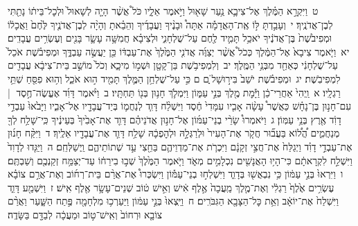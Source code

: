 \documentclass[18pt]{article}
\newcommand{\vart}[1]{\Bfootnote{#1}}	%
\begin{document}
 {\loc ט~}וַיִּקְרָ֣א הַמֶּ֗לֶךְ אֶל־צִיבָ֛א נַ֥עַר שָׁא֖וּל וַיֹּ֣אמֶר אֵלָ֑יו כֹּל֩ אֲשֶׁ֨ר הָיָ֤ה לְשָׁאוּל֙ וּלְכׇל־בֵּית֔וֹ נָתַ֖תִּי לְבֶן־אֲדֹנֶֽיךָ׃ \startlock
 {\loc י~}וְעָבַ֣דְתָּ לּ֣וֹ אֶֽת־הָאֲדָמָ֡ה אַתָּה֩ וּבָנֶ֨יךָ וַעֲבָדֶ֜יךָ וְהֵבֵ֗אתָ וְהָיָ֨ה לְבֶן־אֲדֹנֶ֤יךָ לֶּ֙חֶם֙ וַאֲכָל֔וֹ וּמְפִיבֹ֙שֶׁת֙ בֶּן־אֲדֹנֶ֔יךָ יֹאכַ֥ל תָּמִ֛יד לֶ֖חֶם עַל־שֻׁלְחָנִ֑י וּלְצִיבָ֗א חֲמִשָּׁ֥ה עָשָׂ֛ר בָּנִ֖ים וְעֶשְׂרִ֥ים עֲבָדִֽים׃ \startlock
 {\loc יא~}וַיֹּ֤אמֶר צִיבָא֙ אֶל־הַמֶּ֔לֶךְ כְּכֹל֩ אֲשֶׁ֨ר יְצַוֶּ֜ה אֲדֹנִ֤י הַמֶּ֙לֶךְ֙ אֶת־עַבְדּ֔וֹ כֵּ֖ן יַעֲשֶׂ֣ה עַבְדֶּ֑ךָ וּמְפִיבֹ֗שֶׁת אֹכֵל֙ עַל־שֻׁלְחָנִ֔י כְּאַחַ֖ד מִבְּנֵ֥י הַמֶּֽלֶךְ׃ \startlock
 {\loc יב~}וְלִמְפִיבֹ֥שֶׁת בֵּן־קָטָ֖ן וּשְׁמ֣וֹ מִיכָ֑א וְכֹל֙ מוֹשַׁ֣ב בֵּית־צִיבָ֔א עֲבָדִ֖ים לִמְפִיבֹֽשֶׁת׃ \startlock
 {\loc יג~}וּמְפִיבֹ֗שֶׁת יֹשֵׁב֙ בִּיר֣וּשָׁל ַ֔͏ְם ם כִּ֣י עַל־שֻׁלְחַ֥ן הַמֶּ֛לֶךְ תָּמִ֖יד ה֣וּא אֹכֵ֑ל וְה֥וּא פִסֵּ֖חַ שְׁתֵּ֥י רַגְלָֽיו׃ 
\startlock
 {\loc א~}וַֽיְהִי֙ אַחֲרֵי־כֵ֔ן וַיָּ֕מׇת מֶ֖לֶךְ בְּנֵ֣י עַמּ֑וֹן וַיִּמְלֹ֛ךְ חָנ֥וּן בְּנ֖וֹ תַּחְתָּֽיו׃ \startlock
 {\loc ב~}וַיֹּ֨אמֶר דָּוִ֜ד אֶעֱשֶׂה־חֶ֣סֶד  |  עִם־חָנ֣וּן בֶּן־נָחָ֗שׁ כַּאֲשֶׁר֩ עָשָׂ֨ה אָבִ֤יו עִמָּדִי֙ חֶ֔סֶד וַיִּשְׁלַ֨ח דָּוִ֧ד לְנַחֲמ֛וֹ בְּיַד־עֲבָדָ֖יו אֶל־אָבִ֑יו וַיָּבֹ֙אוּ֙ עַבְדֵ֣י דָוִ֔ד אֶ֖רֶץ בְּנֵ֥י עַמּֽוֹן׃ \startlock
 {\loc ג~}וַיֹּאמְרוּ֩ שָׂרֵ֨י בְנֵי־עַמּ֜וֹן אֶל־חָנ֣וּן אֲדֹנֵיהֶ֗ם  \edtext{הַֽמְכַבֵּ֨ד}{\vart{א=הַֽמֲכַבֵּ֨ד | }}  דָּוִ֤ד אֶת־אָבִ֙יךָ֙ בְּעֵינֶ֔יךָ כִּֽי־שָׁלַ֥ח לְךָ֖ מְנַחֲמִ֑ים הֲ֠ל֠וֹא בַּעֲב֞וּר חֲקֹ֤ר אֶת־הָעִיר֙ וּלְרַגְּלָ֣הּ וּלְהׇפְכָ֔הּ שָׁלַ֥ח דָּוִ֛ד אֶת־עֲבָדָ֖יו אֵלֶֽיךָ׃ \startlock
 {\loc ד~}וַיִּקַּ֨ח חָנ֜וּן אֶת־עַבְדֵ֣י דָוִ֗ד וַיְגַלַּח֙ אֶת־חֲצִ֣י זְקָנָ֔ם וַיִּכְרֹ֧ת אֶת־מַדְוֵיהֶ֛ם בַּחֵ֖צִי עַ֣ד שְׁתוֹתֵיהֶ֑ם וַֽיְשַׁלְּחֵֽם׃ \startlock
 {\loc ה~}וַיַּגִּ֤דוּ לְדָוִד֙ וַיִּשְׁלַ֣ח לִקְרָאתָ֔ם כִּי־הָי֥וּ הָאֲנָשִׁ֖ים נִכְלָמִ֣ים מְאֹ֑ד וַיֹּ֤אמֶר הַמֶּ֙לֶךְ֙ שְׁב֣וּ בִירֵח֔וֹ עַד־יְצַמַּ֥ח זְקַנְכֶ֖ם וְשַׁבְתֶּֽם׃ \startlock
 {\loc ו~}וַיִּרְאוּ֙ בְּנֵ֣י עַמּ֔וֹן כִּ֥י נִבְאֲשׁ֖וּ בְּדָוִ֑ד וַיִּשְׁלְח֣וּ בְנֵי־עַמּ֡וֹן וַיִּשְׂכְּרוּ֩ אֶת־אֲרַ֨ם בֵּית־רְח֜וֹב וְאֶת־אֲרַ֣ם צוֹבָ֗א עֶשְׂרִ֥ים אֶ֙לֶף֙ רַגְלִ֔י וְאֶת־מֶ֤לֶךְ מַֽעֲכָה֙ אֶ֣לֶף אִ֔ישׁ וְאִ֣ישׁ ט֔וֹב שְׁנֵים־עָשָׂ֥ר אֶ֖לֶף אִֽישׁ׃ \startlock
 {\loc ז~}וַיִּשְׁמַ֖ע דָּוִ֑ד וַיִּשְׁלַח֙ אֶת־יוֹאָ֔ב וְאֵ֥ת כׇּל־הַצָּבָ֖א הַגִּבֹּרִֽים׃ \startlock
 {\loc ח~}וַיֵּֽצְאוּ֙ בְּנֵ֣י עַמּ֔וֹן וַיַּעַרְכ֥וּ מִלְחָמָ֖ה פֶּ֣תַח הַשָּׁ֑עַר וַאֲרַ֨ם צוֹבָ֤א וּרְחוֹב֙ וְאִֽישׁ־ט֣וֹב וּמַעֲכָ֔ה לְבַדָּ֖ם בַּשָּׂדֶֽה׃ \startlock
\end{document}

